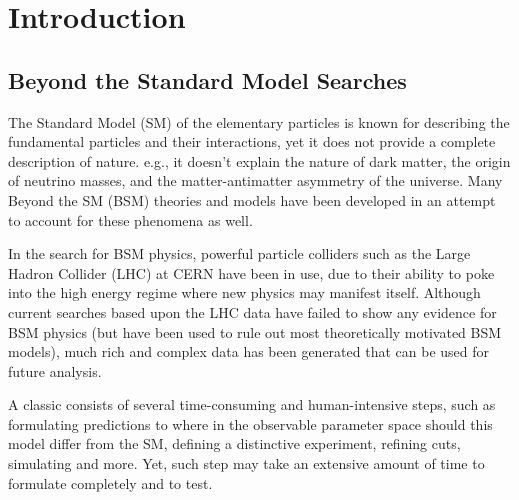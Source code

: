 \documentclass[../Elad_Kliger_Thesis.tex]{subfiles}
\begin{document}
\section{Introduction}


\subsection{Beyond the Standard Model Searches}

The Standard Model (SM) of the elementary particles \cite{Grossman_StandardModel_2023} is known for describing the fundamental particles and their interactions, yet it does not provide a complete description of nature. e.g., it doesn't explain\cite{Grossman_StandardModel_2023} the nature of dark matter, the origin of neutrino masses, and the matter-antimatter asymmetry of the universe. Many Beyond the SM (BSM) theories and models have been developed in an attempt to account for these phenomena as well. 

 In the search for BSM physics, powerful particle colliders such as the Large Hadron Collider (LHC) at CERN have been in use, due to their ability to poke into the high energy regime where new physics may manifest itself. Although current searches based upon the LHC data have failed to show any evidence for BSM physics (but have been used to rule out most theoretically motivated BSM models), much rich and complex data has been generated that can be used for future analysis.

A classic  %
consists of several time-consuming and human-intensive steps, such as formulating  predictions to where in the observable parameter space should this model differ from the SM, defining a distinctive experiment, refining cuts, simulating and more. Yet, such step may take an extensive amount of time to formulate completely and to test.
\end{document}
